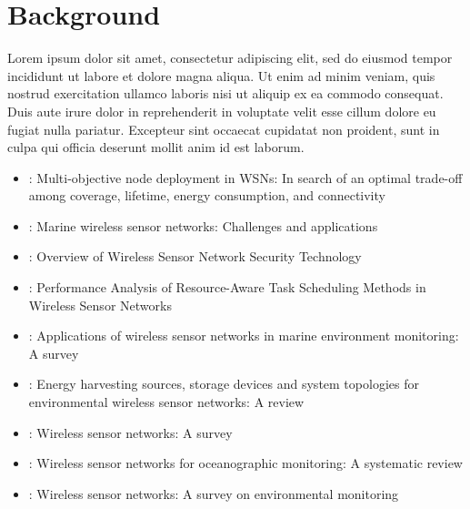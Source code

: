 \section{Background}
\label{section:background}
Lorem ipsum dolor sit amet, consectetur adipiscing elit, sed do eiusmod tempor incididunt ut labore et dolore magna aliqua. Ut enim ad minim veniam, quis nostrud exercitation ullamco laboris nisi ut aliquip ex ea commodo consequat. Duis aute irure dolor in reprehenderit in voluptate velit esse cillum dolore eu fugiat nulla pariatur. Excepteur sint occaecat cupidatat non proident, sunt in culpa qui officia deserunt mollit anim id est laborum.

\begin{itemize}
	\item \cite{Sengupta2013}: Multi-objective node deployment in WSNs: In search of an optimal trade-off among coverage, lifetime, energy consumption, and connectivity 
	
	\item \cite{Mahdy2008}: Marine wireless sensor networks: Challenges and applications
	
	\item \cite{Islam12}: Overview of Wireless Sensor Network Security Technology
	
	\item  \cite{doi:10.1155/2014/765182}: Performance Analysis of Resource-Aware Task Scheduling Methods in Wireless Sensor Networks
	
	\item\cite{Xu2014f}: Applications of wireless sensor networks in marine environment monitoring: A survey
	
	\item \cite{Prauzek2018}: Energy harvesting sources, storage devices and system topologies for environmental wireless sensor networks: A review
	
	\item \cite{Akyildiz}: Wireless sensor networks: A survey
	
	\item \cite{Albaladejo2010}: Wireless sensor networks for oceanographic monitoring: A systematic review
	
	\item \cite{Oliveira2011}: Wireless sensor networks: A survey on environmental monitoring
	
\end{itemize}
